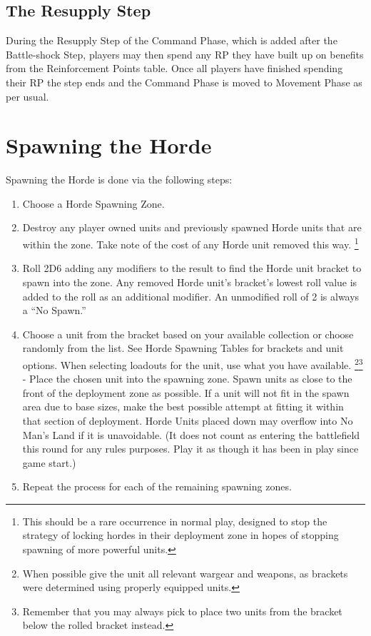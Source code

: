 \documentclass{HordeModeTarot}
\begin{document}
\subsection*{The Resupply Step}

During the Resupply Step of the Command Phase, which is added after the Battle-shock Step, players may then spend any RP they have built up on benefits from the Reinforcement Points table.  Once all players have finished spending their RP the step ends and the Command Phase is moved to Movement Phase as per usual.

\section{Spawning the Horde}\hypertarget{spawning-the-horde}{}\label{spawning-the-horde}

Spawning the Horde is done via the following steps:

\begin{enumerate}
\item{} Choose a Horde Spawning Zone.
\item{} Destroy any player owned units and previously spawned Horde units that are within the zone. Take note of the cost of any Horde unit removed this way. \footnote{This should be a rare occurrence in normal play, designed to stop the strategy of locking hordes in their deployment zone in hopes of stopping spawning of more powerful units.}
\item{} Roll 2D6 adding any modifiers to the result to find the Horde unit bracket to spawn into the zone. Any removed Horde unit's bracket's lowest roll value is added to the roll as an additional modifier. An unmodified roll of 2 is always a “No Spawn.”
\item{} Choose a unit from the bracket based on your available collection or choose randomly from the list. See Horde Spawning Tables for brackets and unit options. When selecting loadouts for the unit, use what you have available. \footnote{When possible give the unit all relevant wargear and weapons, as brackets were determined using properly equipped units.}\footnote{Remember that you may always pick to place two units from the bracket below the rolled bracket instead.}
    - Place the chosen unit into the spawning zone. Spawn units as close to the front of the deployment zone as possible. If a unit will not fit in the spawn area due to base sizes, make the best possible attempt at fitting it within that section of deployment. Horde Units placed down may overflow into No Man's Land if it is unavoidable. (It does not count as entering the battlefield this round for any rules purposes. Play it as though it has been in play since game start.)
\item{} Repeat the process for each of the remaining spawning zones.
\end{enumerate}
\end{document}
